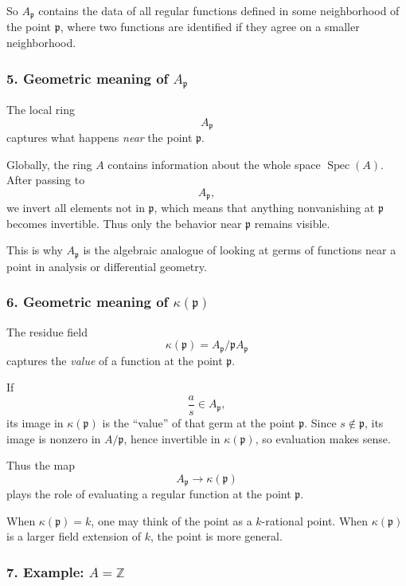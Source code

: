 \documentclass[12pt,a4paper]{article}
\theoremstyle{notespace}
\newcommand{\Spec}{\operatorname{Spec}}
\theoremstyle{definition}
\begin{document}
So \(A_{\mathfrak p}\) contains the data of all regular functions defined in some neighborhood of the point \(\mathfrak p\), where two functions are identified if they agree on a smaller neighborhood.

\subsubsection{5. Geometric meaning of \(A_{\mathfrak p}\)}

The local ring
\[
A_{\mathfrak p}
\]
captures what happens \emph{near} the point \(\mathfrak p\).

Globally, the ring \(A\) contains information about the whole space \(\Spec(A)\). After passing to
\[
A_{\mathfrak p},
\]
we invert all elements not in \(\mathfrak p\), which means that anything nonvanishing at \(\mathfrak p\) becomes invertible. Thus only the behavior near \(\mathfrak p\) remains visible.

This is why \(A_{\mathfrak p}\) is the algebraic analogue of looking at germs of functions near a point in analysis or differential geometry.

\subsubsection{6. Geometric meaning of \(\kappa(\mathfrak p)\)}

The residue field
\[
\kappa(\mathfrak p)=A_{\mathfrak p}/\mathfrak p A_{\mathfrak p}
\]
captures the \emph{value} of a function at the point \(\mathfrak p\).

If
\[
\frac{a}{s}\in A_{\mathfrak p},
\]
its image in \(\kappa(\mathfrak p)\) is the ``value'' of that germ at the point \(\mathfrak p\). Since \(s\notin \mathfrak p\), its image is nonzero in \(A/\mathfrak p\), hence invertible in \(\kappa(\mathfrak p)\), so evaluation makes sense.

Thus the map
\[
A_{\mathfrak p}\longrightarrow \kappa(\mathfrak p)
\]
plays the role of evaluating a regular function at the point \(\mathfrak p\).

When \(\kappa(\mathfrak p)=k\), one may think of the point as a \(k\)-rational point. When \(\kappa(\mathfrak p)\) is a larger field extension of \(k\), the point is more general.

\subsubsection{7. Example: \(A=\mathbb Z\)}
\end{document}
